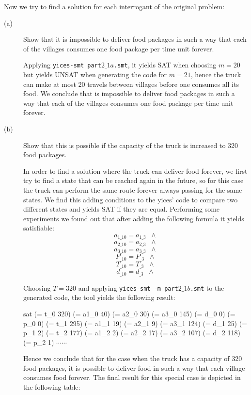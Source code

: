 Now we try to find a solution for each interrogant of the original problem:
\begin{description}
  \item[(a)] Show that it is impossible to deliver food packages in such a way that each of the villages consumes one food package per time unit forever.

  Applying {\tt yices-smt part$2\_1a$.smt}, it yields SAT when choosing $m=20$ but yields UNSAT when generating the code for $m=21$, hence the truck can make at most 20 travels between villages before one consumes all its food. We conclude that is impossible to deliver food packages in such a way that each of the villages consumes one food package per time unit forever.

  \item[(b)]  Show that this is possible if the capacity of the truck is increased to 320 food packages.

  In order to find a solution where the truck can deliver food forever, we first try to find a state that can be reached again in the future, so for this case the truck can perform the same route forever always passing for the same states. We find this adding conditions to the yices' code to compare two different states and yields SAT if they are equal. Performing some experiments we found out that after adding the following formula it yields satisfiable:
  \[a_{1\_10} = a_{1\_3} \;\;\wedge\]
  \[a_{2\_10} = a_{2\_3} \;\;\wedge\]
  \[a_{3\_10} = a_{3\_3} \;\;\wedge\]
  \[P_{\_10} = P_{\_3} \;\;\wedge\]
  \[T_{\_10} = T_{\_3} \;\;\wedge\]
  \[d_{\_10} = d_{\_3} \;\;\wedge\]

  Choosing $T = 320$ and applying {\tt yices-smt -m part$2\_1b$.smt} to the generated code, the tool yields the following result:

  \selectfont
  {\footnotesize
  \noindent

sat\break
(= t\_0 320)\break
(= a1\_0 40)\break
(= a2\_0 30)\break
(= a3\_0 145)\break
(= d\_0 0)\break
(= p\_0 0)\break
(= t\_1 295)\break
(= a1\_1 19)\break
(= a2\_1 9)\break
(= a3\_1 124)\break
(= d\_1 25)\break
(= p\_1 2)\break
(= t\_2 177)\break
(= a1\_2 2)\break
(= a2\_2 17)\break
(= a3\_2 107)\break
(= d\_2 118)\break
(= p\_2 1)\break
$\cdots \cdots$
  }
  \selectfont
  \vspace{3mm}

  Hence we conclude that for the case when the truck has a capacity of 320 food packages, it is possible to deliver food in such a way that each village consumes food forever. The final result for this special case is depicted in the following table:


\end{description}
